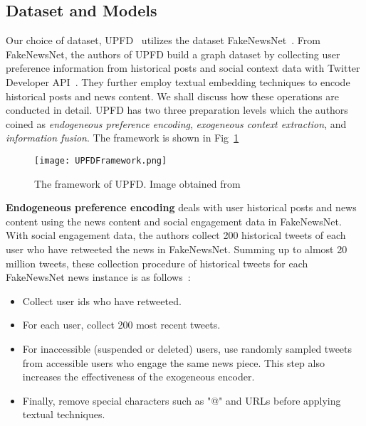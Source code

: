 \subsection{Dataset and Models}
\label{subsec:mixedApproaches_DatasetAndModel}
Our choice of dataset, UPFD~\parencite{UPFD_Dataset_Shu} utilizes the dataset FakeNewsNet~\parencite{FakeNewsNet_Shu}. From FakeNewsNet, the authors of UPFD build a graph dataset by collecting user preference information from historical posts and social context data with Twitter Developer API~\parencite{TwitterAPI_Twitter}. They further employ textual embedding techniques to encode historical posts and news content. We shall discuss how these operations are conducted in detail. UPFD has two three preparation levels which the authors coined as \emph{endogeneous preference encoding}, \emph{exogeneous context extraction}, and \emph{information fusion}. The framework is shown in Fig~\ref{fig:UPFD_Framework}\\
\begin{figure}
    \centering
    \texttt{[image: UPFDFramework.png]}
    \caption[UPFD Framework]{The framework of UPFD. Image obtained from~\parencite{UPFD_Dataset_Shu}}
    \label{fig:UPFD_Framework}
\end{figure}
\textbf{Endogeneous preference encoding} deals with user historical posts and news content using the news content and social engagement data in FakeNewsNet. With social engagement data, the authors collect 200 historical tweets of each user who have retweeted the news in FakeNewsNet. Summing up to almost 20 million tweets, these collection procedure of historical tweets for each FakeNewsNet news instance is as follows~\parencite{UPFD_Dataset_Shu}:
\begin{itemize}
    \item Collect user ids who have retweeted.
    \item For each user, collect 200 most recent tweets.
    \item For inaccessible (suspended or deleted) users, use randomly sampled tweets from accessible users who engage the same news piece. This step also increases the effectiveness of the exogeneous encoder.
    \item  Finally, remove special characters such as "@" and URLs before applying textual techniques.
\end{itemize}
